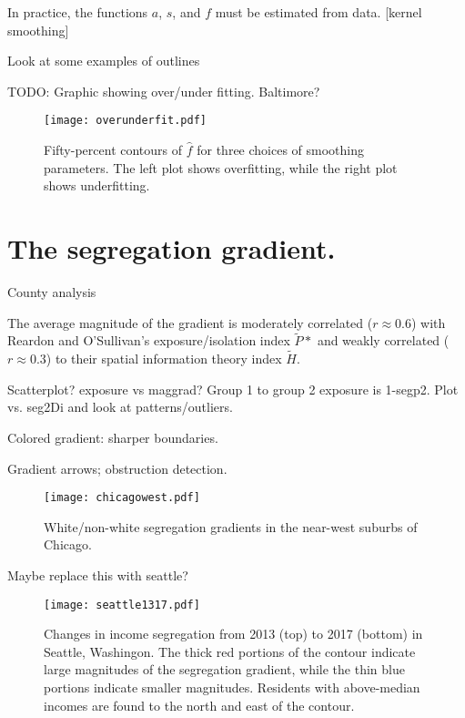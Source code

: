 \documentclass{article}
\theoremstyle{theorem}
\theoremstyle{definition}
\begin{document}
In practice, the functions $a$, $s$, and $f$ must be estimated from data. [kernel smoothing] \cite{wandjones11}

Look at some examples of outlines

TODO: Graphic showing over/under fitting. Baltimore?

\begin{figure}
  \texttt{[image: overunderfit.pdf]}
  \caption{Fifty-percent contours of $\hat{f}$ for three choices of smoothing parameters. The left plot shows overfitting, while the right plot shows underfitting.}
  \label{fig:overunderfit}
\end{figure}

\section{The segregation gradient.}

County analysis

The average magnitude of the gradient is moderately correlated ($r \approx 0.6$) with Reardon and O'Sullivan's exposure/isolation index $\tilde{P}*$ and weakly correlated ($r\approx 0.3$) to their spatial information theory index $\tilde{H}$.

Scatterplot? exposure vs maggrad? Group 1 to group 2 exposure is 1-segp2. Plot vs. seg2Di and look at patterns/outliers.

Colored gradient: sharper boundaries.

Gradient arrows; obstruction detection.

\begin{figure}
  \texttt{[image: chicagowest.pdf]}
  \caption{White/non-white segregation gradients in the near-west suburbs of Chicago.}
  \label{fig:chicagowest}
\end{figure}

Maybe replace this with seattle?

\begin{figure}
  \texttt{[image: seattle1317.pdf]}
  \caption{Changes in income segregation from 2013 (top) to 2017 (bottom) in Seattle, Washingon. The thick red portions of the contour indicate large magnitudes of the segregation gradient, while the thin blue portions indicate smaller magnitudes. Residents with above-median incomes are found to the north and east of the contour.}
  \label{fig:seattle1317}
\end{figure}


\end{document}
